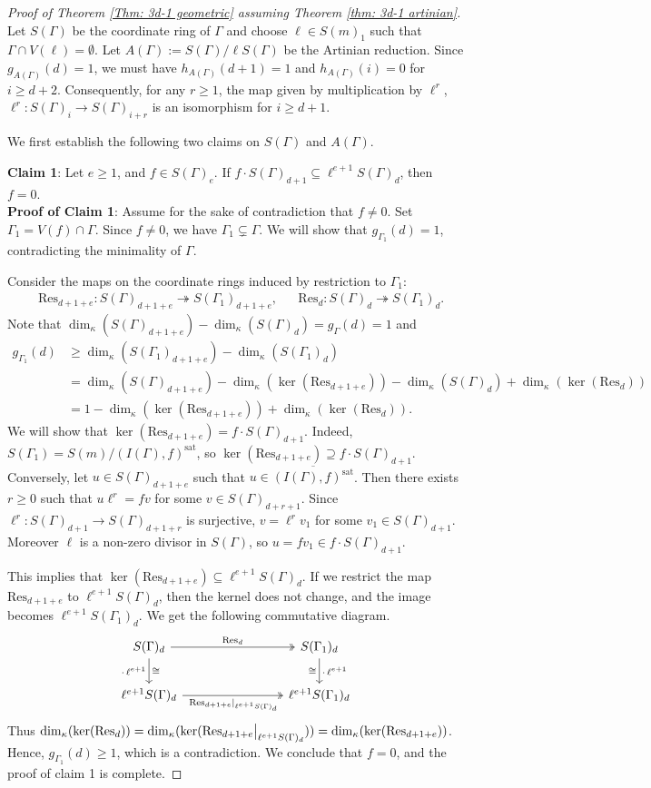 \documentclass[11pt]{amsart}
\theoremstyle{definition}
\newcommand{\sg}{S(\Gamma)}
\newcommand{\ag}{A(\Gamma)}
\newcommand{\dimk}{\dim_{\kappa}}
\newcommand{\Ag}{A(\Gamma)}
\newcommand{\ga}{g_{A(\Gamma)}}
\newcommand{\ggo}{g_{\Gamma_1}}
\newcommand{\go}{\Gamma_1}
\newcommand{\sgo}{S(\Gamma_1)}
\newcommand{\Res}{\text{Res}}
\newcommand\restr[2]{{%
  \left.\kern-\nulldelimiterspace %
  #1 %
  \vphantom{\big|} %
  \right|_{#2} %
  }}
\begin{document}
\begin{proof}[Proof of Theorem \ref{Thm: 3d-1 geometric} assuming Theorem \ref{thm: 3d-1 artinian}]
Let $\sg$ be the coordinate ring of $\Gamma$ and choose $\ell \in S(m)_1$ such that $\Gamma \cap V(\ell) =\emptyset$. Let $\Ag:=\sg/\ell \sg$ be the Artinian reduction. Since $\ga(d)=1$, we must have $h_{\ag}(d+1)=1$ and $h_{\ag}(i)=0$ for $i \geq d+2$. Consequently, for any $r \geq 1$, the map given by multiplication by $\ell^r$, $\ell^r: \sg_{i} \to \sg_{i+r}$
is an isomorphism for $i \geq d+1$. 

We first establish the following two claims on $\sg$ and $\ag$.

\noindent\textbf{Claim 1}:
Let $e \geq 1$, and $f \in \sg_e$. If $f\cdot\sg_{d+1} \subseteq \ell^{e+1}\sg_{d}$, then $f=0$.\\
\noindent\textbf{Proof of Claim 1}:
Assume for the sake of contradiction that $f \neq 0$. Set $\Gamma_1=V(f) \cap \Gamma$. Since $f \neq 0$, we have $\Gamma_1 \subsetneq \Gamma$. We will show that $\ggo(d)=1$, contradicting the minimality of $\Gamma$.


Consider the maps on the coordinate rings induced by restriction to $\go$:
\begin{align*}
&\Res_{d+1+e}: \sg_{d+1+e} \twoheadrightarrow \sgo_{d+1+e},
&
&\Res_{d}: \sg_{d} \twoheadrightarrow \sgo_{d}.
\end{align*}
Note that $\dimk(\sg_{d+1+e}) - \dimk(\sg_d) = g_{\Gamma}(d)=1$ and 
\begin{align*}
g_{\Gamma_1}(d)
&\geq \dimk(\sgo_{d+1+e}) - \dimk(\sgo_d)\\
&= \dimk(\sg_{d+1+e}) -\dimk(\ker(\Res_{d+1+e}))
-\dimk(\sg_{d}) +\dimk(\ker(\Res_{d}))\\
&=1 -\dimk(\ker(\Res_{d+1+e}))+\dimk(\ker(\Res_{d})).
\end{align*}
We will show that $\ker(\Res_{d+1+e})=f\cdot\sg_{d+1}$. Indeed, $\sgo=S(m)/(I(\Gamma),f)^{\text{sat}}$, so $\ker(\Res_{d+1+e}) \supseteq f\cdot\sg_{d+1}$. 
Conversely, let $u \in \sg_{d+1+e}$ such that $u \in \overline{(I(\Gamma),f)^{\text{sat}}}$. 
Then there exists $r \geq 0$ such that $u\ell^r=fv$ for some $v \in \sg_{d+r+1}$. Since $\ell^r: \sg_{d+1} \to \sg_{d+1+r}$ is surjective, $v= \ell^r v_1$ for some $v_1\in \sg_{d+1}$. Moreover $\ell$ is a non-zero divisor in $\sg$, so $u=f v_1 \in f\cdot\sg_{d+1}$.

This implies that $\ker(\Res_{d+1+e}) \subseteq \ell^{e+1} \sg_d$. If we restrict the map $\Res_{d+1+e}$ to $\ell^{e+1} \sg_d$, then the kernel does not change, and the image becomes $\ell^{e+1} \sgo_{d}$.
We get the following commutative diagram.
\[
\begin{tikzcd}[row sep=2em, column sep=8em]
\sg_d
    \arrow[r, two heads, "\Res_d"]
    \arrow[d, "\cdot\,\ell^{e+1}"', "\cong"]
&
\sgo_d
    \arrow[d, "\cdot\,\ell^{e+1}", "\cong"']
\\
\ell^{e+1}\sg_d
    \arrow[r, two heads,
        "\left.\Res_{d+1+e}\right|_{\ell^{e+1}\sg_d}"']
&
\ell^{e+1}\sgo_d
\end{tikzcd}
\]
Thus $\dimk(\ker(\Res_d)) = \dimk(\ker(\restr{\Res_{d+1+e}}{\ell^{e+1}\sg_d})) = \dimk(\ker(\Res_{d+1+e}))$. Hence, $g_{\Gamma_1}(d)\geq 1$, which is a contradiction. We conclude that $f=0$, and the proof of claim 1 is complete.


\end{proof}
\end{document}
